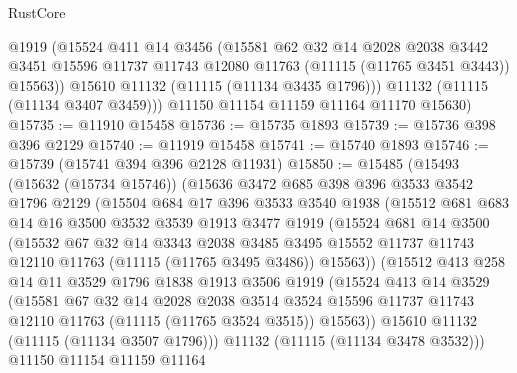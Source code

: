 \begin{lexlean}{RustCore}
\begin{coremodule}
          @1919
          (@15524
            @411
            @14
            @3456
            (@15581
              @62
              @32
              @14
              @2028
              @2038
              @3442
              @3451
              @15596
              @11737
              @11743
              @12080
              @11763
              (@11115 (@11765 @3451 @3443))
              @15563))
          @15610
          @11132
          (@11115 (@11134 @3435 @1796)))
        @11132
        (@11115 (@11134 @3407 @3459)))
      @11150
      @11154
      @11159
      @11164
      @11170
      @15630)
@15735 := @11910 @15458
@15736 := @15735 @1893
@15739 := @15736 @398 @396 @2129
@15740 := @11919 @15458
@15741 := @15740 @1893
@15746 := @15739 (@15741 @394 @396 @2128 @11931)
@15850 := @15485
    (@15493
      (@15632 (@15734 @15746))
      (@15636
        @3472
        @685
        @398
        @396
        @3533
        @3542
        @1796
        @2129
        (@15504
          @684
          @17
          @396
          @3533
          @3540
          @1938
          (@15512
            @681
            @683
            @14
            @16
            @3500
            @3532
            @3539
            @1913
            @3477
            @1919
            (@15524
              @681
              @14
              @3500
              (@15532
                @67
                @32
                @14
                @3343
                @2038
                @3485
                @3495
                @15552
                @11737
                @11743
                @12110
                @11763
                (@11115 (@11765 @3495 @3486))
                @15563))
            (@15512
              @413
              @258
              @14
              @11
              @3529
              @1796
              @1838
              @1913
              @3506
              @1919
              (@15524
                @413
                @14
                @3529
                (@15581
                  @67
                  @32
                  @14
                  @2028
                  @2038
                  @3514
                  @3524
                  @15596
                  @11737
                  @11743
                  @12110
                  @11763
                  (@11115 (@11765 @3524 @3515))
                  @15563))
              @15610
              @11132
              (@11115 (@11134 @3507 @1796)))
            @11132
            (@11115 (@11134 @3478 @3532)))
          @11150
          @11154
          @11159
          @11164

\end{coremodule}
\end{lexlean}
